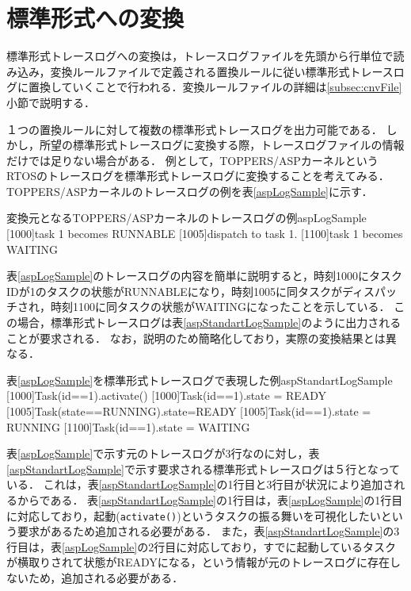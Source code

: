 \section{標準形式への変換}

標準形式トレースログへの変換は，トレースログファイルを先頭から行単位で読み込み，変換ルールファイルで定義される置換ルールに従い標準形式トレースログに置換していくことで行われる．変換ルールファイルの詳細は\ref{subsec:cnvFile}小節で説明する．

１つの置換ルールに対して複数の標準形式トレースログを出力可能である．
しかし，所望の標準形式トレースログに変換する際，トレースログファイルの情報だけでは足りない場合がある．
例として，TOPPERS/ASPカーネル\cite{TOPPERS}というRTOSのトレースログを標準形式トレースログに変換することを考えてみる．
TOPPERS/ASPカーネルのトレースログの例を表\ref{aspLogSample}に示す．

\begin{File}{変換元となるTOPPERS/ASPカーネルのトレースログの例}{aspLogSample}
[1000]task 1 becomes RUNNABLE
[1005]dispatch to task 1.
[1100]task 1 becomes WAITING
\end{File}

表\ref{aspLogSample}のトレースログの内容を簡単に説明すると，時刻1000にタスクIDが1のタスクの状態がRUNNABLEになり，時刻1005に同タスクがディスパッチされ，時刻1100に同タスクの状態がWAITINGになったことを示している．
この場合，標準形式トレースログは表\ref{aspStandartLogSample}のように出力されることが要求される．
なお，説明のため簡略化しており，実際の変換結果とは異なる．

\begin{File}{表\ref{aspLogSample}を標準形式トレースログで表現した例}{aspStandartLogSample}
[1000]Task(id==1).activate()
[1000]Task(id==1).state = READY
[1005]Task(state==RUNNING).state=READY
[1005]Task(id==1).state = RUNNING
[1100]Task(id==1).state = WAITING
\end{File}

表\ref{aspLogSample}で示す元のトレースログが3行なのに対し，表\ref{aspStandartLogSample}で示す要求される標準形式トレースログは５行となっている．
これは，表\ref{aspStandartLogSample}の1行目と3行目が状況により追加されるからである．
表\ref{aspStandartLogSample}の1行目は，表\ref{aspLogSample}の1行目に対応しており，起動(\verb|activate()|)というタスクの振る舞いを可視化したいという要求があるため追加される必要がある．
また，表\ref{aspStandartLogSample}の3行目は，表\ref{aspLogSample}の2行目に対応しており，すでに起動しているタスクが横取りされて状態がREADYになる，という情報が元のトレースログに存在しないため，追加される必要がある．

